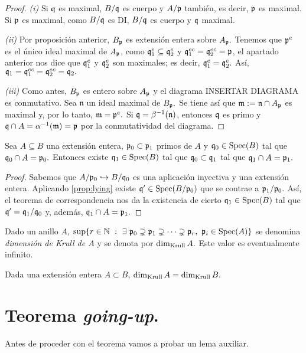 \documentclass[../main.tex]{subfiles}
\begin{document}
\begin{proof}
\textit{(i)} Si $\mathfrak{q}$ es maximal, $B/\mathfrak{q}$ es cuerpo y $A/\mathfrak{p}$ también, es decir, $\mathfrak{p}$ es maximal. Si $\mathfrak{p}$ es maximal, como $B/\mathfrak{q}$ es DI, $B/\mathfrak{q}$ es cuerpo y $\mathfrak{q}$ maximal.

\textit{(ii)} Por proposición anterior, $B_{\mathfrak{p}}$ es extensión entera sobre $A_{\mathfrak{p}}.$ Tenemos que $\mathfrak{p}^e$ es el único ideal maximal de $A_{\mathfrak{p}}$, como $\mathfrak{q}_1^e\subseteq \mathfrak{q}_2^e$ y $\mathfrak{q}_1^{ec}= \mathfrak{q}_2^{ec}=\mathfrak{p}$, el apartado anterior nos dice que $\mathfrak{q}_1^e$ y $\mathfrak{q}_2^e$ son maximales; es decir, $\mathfrak{q}_1^e=\mathfrak{q}_2^e.$ Así, $\mathfrak{q}_1=\mathfrak{q}_1^{ec}=\mathfrak{q}_2^{ec}=\mathfrak{q}_2.$

\textit{(iii)} Como antes, $B_{\mathfrak{p}}$ es entero sobre $A_{\mathfrak{p}}$ y el diagrama INSERTAR DIAGRAMA es conmutativo. Sea $\mathfrak{n}$ un ideal maximal de $B_{\mathfrak{p}}.$ Se tiene así que $\mathfrak{m}:=\mathfrak{n}\cap A_{\mathfrak{p}}$ es maximal y, por lo tanto, $\mathfrak{m}=\mathfrak{p}^e.$ Si $\mathfrak{q}=\beta^{-1}(\mathfrak{n})$, entonces $\mathfrak{q}$ es primo y $\mathfrak{q}\cap A=\alpha^{-1}(\mathfrak{m})=\mathfrak{p}$ por la conmutatividad del diagrama.
\end{proof}

\begin{theorem}[Going-up]
Sea $A\subseteq B$ una extensión entera, $\mathfrak{p}_0\subset\mathfrak{p}_1$ primos de $A$ y $\mathfrak{q}_0\in\text{Spec}(B)$ tal que $\mathfrak{q}_0\cap  A=\mathfrak{p}_0.$ Entonces existe $\mathfrak{q}_1\in\text{Spec}(B)$ tal que $\mathfrak{q}_0\subset\mathfrak{q}_1$ tal que $\mathfrak{q}_1\cap A=\mathfrak{p}_1.$
\end{theorem}

\begin{proof}
Sabemos que $A/\mathfrak{p}_0\hookrightarrow B/\mathfrak{q}_0$ es una aplicación inyectiva y una extensión entera. Aplicando \ref{prop:lying} existe $\mathfrak{q}'\in\text{Spec}(B/\mathfrak{p}_0)$ que se contrae a $\mathfrak{p}_1/\mathfrak{p}_0.$ Así, el teorema de correspondencia nos da la existencia de cierto $\mathfrak{q}_1\in\text{Spec}(B)$ tal que $\mathfrak{q}'=\mathfrak{q}_1/\mathfrak{q}_0$ y, además, $\mathfrak{q}_1\cap A=\mathfrak{p}_1.$
\end{proof}

\begin{definition}
Dado un anillo $A$, $\sup\{r\in\N\ :\ \exists\ \p_0\supsetneq\p_1\supsetneq\cdots\supsetneq\p_r,\ \p_i\in\Spec A\}$ se denomina \textit{dimensión de Krull de $A$} y se denota por $\dim_{\text{Krull}} A.$ Este valor es eventualmente infinito.
\end{definition}

\begin{corollary}
Dada una extensión entera $A\subset B$, $\dim_{\text{Krull}} A=\dim_{\text{Krull}} B.$
\end{corollary}

\section{Teorema \textit{going-up}.}
Antes de proceder con el teorema vamos a probar un lema auxiliar.
\end{document}
